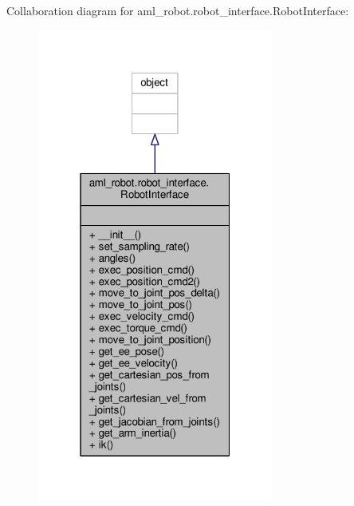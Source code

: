 Collaboration diagram for aml\-\_\-robot.\-robot\-\_\-interface.\-Robot\-Interface\-:\nopagebreak
\begin{figure}[H]
\begin{center}
\leavevmode
\includegraphics[width=220pt]{classaml__robot_1_1robot__interface_1_1_robot_interface__coll__graph}
\end{center}
\end{figure}
